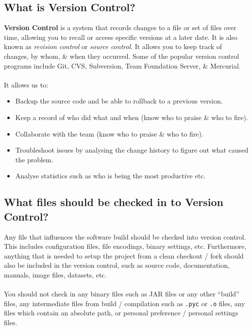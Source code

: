 \documentclass[a4paper,11pt]{article}
\begin{document}
\subsection{What is Version Control?}
\textbf{Version Control} is a system that records changes to a file or set of files over time, allowing you to recall or access specific versions
at a later date.
It is also known as \textit{revision control} or \textit{source control}.
It allows you to keep track of changes, by whom, \& when they occurred.
Some of the popular version control programs include Git, CVS, Subversion, Team Foundation Server, \& Mercurial.
\\\\
It allows us to:
\begin{itemize}
    \item   Backup the source code and be able to rollback to a previous version.
    \item   Keep a record of who did what and when (know who to praise \& who to fire).
    \item   Collaborate with the team (know who to praise \& who to fire).
    \item   Troubleshoot issues by analysing the change history to figure out what caused the problem.
    \item   Analyse statistics such as who is being the most productive etc.
\end{itemize}

\subsection{What files should be checked in to Version Control?}
Any file that influences the software build should be checked into version control.
This includes configuration files, file encodings, binary settings, etc.
Furthermore, anything that is needed to setup the project from a clean checkout / fork should also be included in the version 
control, such as source code, documentation, manuals, image files, datasets, etc.
\\\\
You should not check in any binary files such as JAR files or any other ``build'' files, any intermediate files from build / 
compilation such as \verb|.pyc| or \verb|.o| files, any files which contain an absolute path, or personal preference /
personal settings files.
\end{document}
